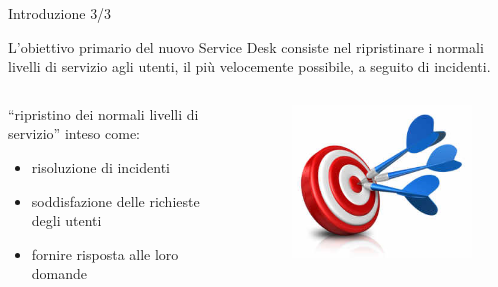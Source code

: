 \begin{frame}{Introduzione \small{3/3}}
\begin{theorem}[Obiettivo]
L'obiettivo primario del nuovo Service Desk consiste nel ripristinare i normali livelli di servizio agli utenti, il più velocemente possibile, a seguito di incidenti.
\end{theorem}
\begin{columns}
\begin{column}{0.8\textwidth}
``ripristino dei normali livelli di servizio'' inteso come:
\begin{itemize}
\item{risoluzione di incidenti}
\item{soddisfazione delle richieste degli utenti}
\item{fornire risposta alle loro domande}
\end{itemize}
\end{column}
\begin{column}{0.2\textwidth}
\begin{figure}
\includegraphics[scale=0.25]{Images/Objectives.png}
\end{figure}
\end{column}
\end{columns}
\end{frame}

